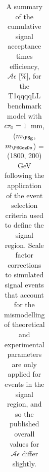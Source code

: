 \begin{table}[p]
\begin{center}
\begin{tabular}{lrr}
      \hline
        \end{tabular}
        \caption{A summary of the cumulative signal acceptance times
        efficiency, $\mathcal{A}\epsilon$ [\%], for the
        T1qqqqLL benchmark model with $c\tau_{0}=1$~mm, ($m_{\PSg}$, $m_{\PSGczDo}$) = (1800, 200) GeV
        following the application of
        the event selection criteria used to define the signal region.  Scale
        factor corrections to simulated signal events that account for the
        mismodelling of theoretical and experimental parameters are only
        applied for events in the signal region, and so the published overall
        values for $\mathcal{A}\epsilon$ differ slightly.
}
        \label{tab:T1qqqqLL_1_1800_200_MR_sig}
    \end{center}
\end{table}
